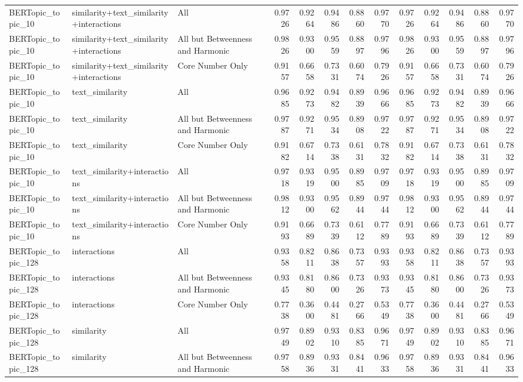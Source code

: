 \begin{tabular}{lllrrrrrrrrrr}
BERTopic_topic_10 & similarity+text_similarity+interactions & All & 0.9726 & 0.9264 & 0.9486 & 0.8860 & 0.9770 & 0.9726 & 0.9264 & 0.9486 & 0.8860 & 0.9770 \\
BERTopic_topic_10 & similarity+text_similarity+interactions & All but Betweenness and Harmonic & 0.9826 & 0.9300 & 0.9559 & 0.8897 & 0.9796 & 0.9826 & 0.9300 & 0.9559 & 0.8897 & 0.9796 \\
BERTopic_topic_10 & similarity+text_similarity+interactions & Core Number Only & 0.9157 & 0.6658 & 0.7331 & 0.6074 & 0.7926 & 0.9157 & 0.6658 & 0.7331 & 0.6074 & 0.7926 \\
BERTopic_topic_10 & text_similarity & All & 0.9685 & 0.9273 & 0.9482 & 0.8939 & 0.9666 & 0.9685 & 0.9273 & 0.9482 & 0.8939 & 0.9666 \\
BERTopic_topic_10 & text_similarity & All but Betweenness and Harmonic & 0.9787 & 0.9271 & 0.9534 & 0.8908 & 0.9722 & 0.9787 & 0.9271 & 0.9534 & 0.8908 & 0.9722 \\
BERTopic_topic_10 & text_similarity & Core Number Only & 0.9182 & 0.6714 & 0.7338 & 0.6131 & 0.7832 & 0.9182 & 0.6714 & 0.7338 & 0.6131 & 0.7832 \\
BERTopic_topic_10 & text_similarity+interactions & All & 0.9718 & 0.9319 & 0.9500 & 0.8985 & 0.9709 & 0.9718 & 0.9319 & 0.9500 & 0.8985 & 0.9709 \\
BERTopic_topic_10 & text_similarity+interactions & All but Betweenness and Harmonic & 0.9812 & 0.9300 & 0.9562 & 0.8944 & 0.9744 & 0.9812 & 0.9300 & 0.9562 & 0.8944 & 0.9744 \\
BERTopic_topic_10 & text_similarity+interactions & Core Number Only & 0.9193 & 0.6689 & 0.7339 & 0.6112 & 0.7789 & 0.9193 & 0.6689 & 0.7339 & 0.6112 & 0.7789 \\
BERTopic_topic_128 & interactions & All & 0.9358 & 0.8211 & 0.8638 & 0.7357 & 0.9393 & 0.9358 & 0.8211 & 0.8638 & 0.7357 & 0.9393 \\
BERTopic_topic_128 & interactions & All but Betweenness and Harmonic & 0.9345 & 0.8180 & 0.8600 & 0.7326 & 0.9373 & 0.9345 & 0.8180 & 0.8600 & 0.7326 & 0.9373 \\
BERTopic_topic_128 & interactions & Core Number Only & 0.7738 & 0.3600 & 0.4481 & 0.2766 & 0.5349 & 0.7738 & 0.3600 & 0.4481 & 0.2766 & 0.5349 \\
BERTopic_topic_128 & similarity & All & 0.9749 & 0.8902 & 0.9310 & 0.8385 & 0.9671 & 0.9749 & 0.8902 & 0.9310 & 0.8385 & 0.9671 \\
BERTopic_topic_128 & similarity & All but Betweenness and Harmonic & 0.9758 & 0.8936 & 0.9331 & 0.8441 & 0.9633 & 0.9758 & 0.8936 & 0.9331 & 0.8441 & 0.9633 \\

\end{tabular}
